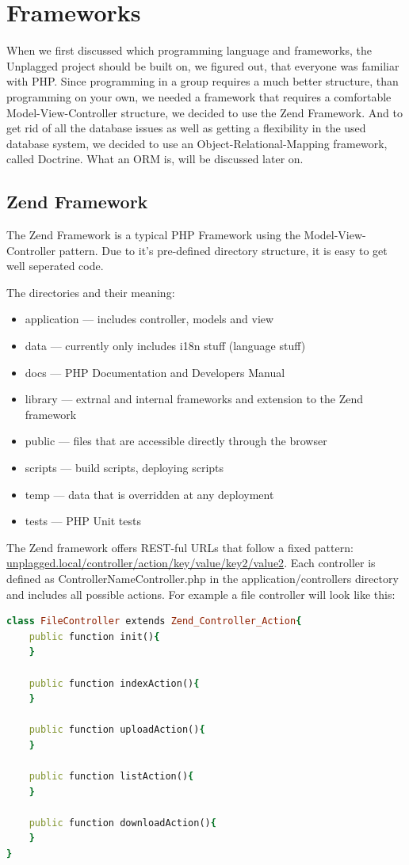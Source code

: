 \section{Frameworks}
When we first discussed which programming language and frameworks, the Unplagged project should be built on, we figured out, that everyone was familiar with PHP. Since programming in a group requires a much better structure, than programming on your own, we needed a framework that requires a comfortable Model-View-Controller structure, we decided to use the Zend Framework. And to get rid of all the database issues as well as getting a flexibility in the used database system, we decided to use an Object-Relational-Mapping framework, called Doctrine. What an ORM is, will be discussed later on.

\subsection{Zend Framework}
The Zend Framework is a typical PHP Framework using the Model-View-Controller pattern. Due to it's pre-defined directory structure, it is easy to get well seperated code. 

The directories and their meaning:
\begin{itemize}
\item application --- includes controller, models and view
\item data --- currently only includes i18n stuff (language stuff)
\item docs --- PHP Documentation and Developers Manual
\item library --- extrnal and internal frameworks and extension to the Zend framework
\item public --- files that are accessible directly through the browser
\item scripts --- build scripts, deploying scripts
\item temp --- data that is overridden at any deployment
\item tests --- PHP Unit tests
\end{itemize}

The Zend framework offers REST-ful URLs that follow a fixed pattern: \url{unplagged.local/controller/action/key/value/key2/value2}. Each controller is defined as ControllerNameController.php in the application/controllers directory and includes all possible actions. For example a file controller will look like this:

\begin{lstlisting}[caption=Persisting an object to the database in Doctrine, label=list:persistingObjectDoctrine, language=Ruby]
class FileController extends Zend_Controller_Action{
	public function init(){
	}

	public function indexAction(){
	}

	public function uploadAction(){
	}

	public function listAction(){
	}
  	
	public function downloadAction(){
	}
}
\end{lstlisting}

